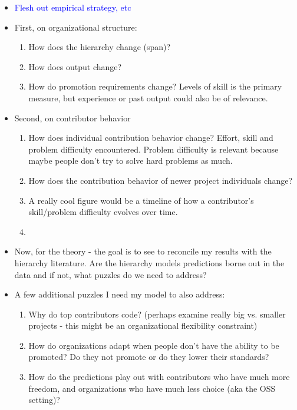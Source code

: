 \documentclass[source/paper/main.tex]{subfiles}
\begin{document}
\begin{itemize}
    \item \textcolor{blue}{Flesh out empirical strategy, etc}
    \item First, on organizational structure:
    \begin{enumerate}
        \item How does the hierarchy change (span)?
        \item How does output change?
        \item How do promotion requirements change? Levels of skill is the primary measure, but experience or past output could also be of relevance. 
    \end{enumerate}
    \item Second, on contributor behavior
    \begin{enumerate}
        \item How does individual contribution behavior change? Effort, skill and problem difficulty encountered. Problem difficulty is relevant because maybe people don't try to solve hard problems as much. 
        \item How does the contribution behavior of newer project individuals change?\
        \item A really cool figure would be a timeline of how a contributor's skill/problem difficulty evolves over time.
        \item 
    \end{enumerate}
    \item Now, for the theory - the goal is to see to reconcile my results with the hierarchy literature. Are the hierarchy models predictions borne out in the data and if not, what puzzles do we need to address?
    \item A few additional puzzles I need my model to also address:
    \begin{enumerate}
        \item Why do top contributors code? (perhaps examine really big vs. smaller projects - this might be an organizational flexibility constraint)
        \item How do organizations adapt when people don't have the ability to be promoted? Do they not promote or do they lower their standards?
        \item How do the predictions play out with contributors who have much more freedom, and organizations who have much less choice (aka the OSS setting)?
    \end{enumerate}
    
\end{itemize}
\end{document}
